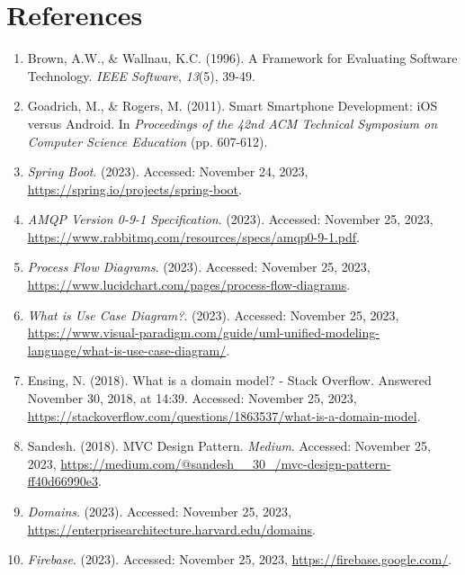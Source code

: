 \documentclass{article}
\begin{document}
\section*{References}

\begin{enumerate}
    \item Brown, A.W., & Wallnau, K.C. (1996). A Framework for Evaluating Software Technology. \textit{IEEE Software}, \textit{13}(5), 39-49.

    \item Goadrich, M., & Rogers, M. (2011). Smart Smartphone Development: iOS versus Android. In \textit{Proceedings of the 42nd ACM Technical Symposium on Computer Science Education} (pp. 607-612).

    \item \textit{Spring Boot}. (2023). Accessed: November 24, 2023, \url{https://spring.io/projects/spring-boot}.

    \item \textit{AMQP Version 0-9-1 Specification}. (2023). Accessed: November 25, 2023, \url{https://www.rabbitmq.com/resources/specs/amqp0-9-1.pdf}.

    \item \textit{Process Flow Diagrams}. (2023). Accessed: November 25, 2023, \url{https://www.lucidchart.com/pages/process-flow-diagrams}.

    \item \textit{What is Use Case Diagram?}. (2023). Accessed: November 25, 2023, \url{https://www.visual-paradigm.com/guide/uml-unified-modeling-language/what-is-use-case-diagram/}.

    \item Ensing, N. (2018). What is a domain model? - Stack Overflow. Answered November 30, 2018, at 14:39. Accessed: November 25, 2023, \url{https://stackoverflow.com/questions/1863537/what-is-a-domain-model}.

    \item Sandesh. (2018). MVC Design Pattern. \textit{Medium}. Accessed: November 25, 2023, \url{https://medium.com/@sandesh__30_/mvc-design-pattern-ff40d66990e3}.

    \item \textit{Domains}. (2023). Accessed: November 25, 2023, \url{https://enterprisearchitecture.harvard.edu/domains}.

    \item \textit{Firebase}. (2023). Accessed: November 25, 2023, \url{https://firebase.google.com/}.


\end{enumerate}
\end{document}
